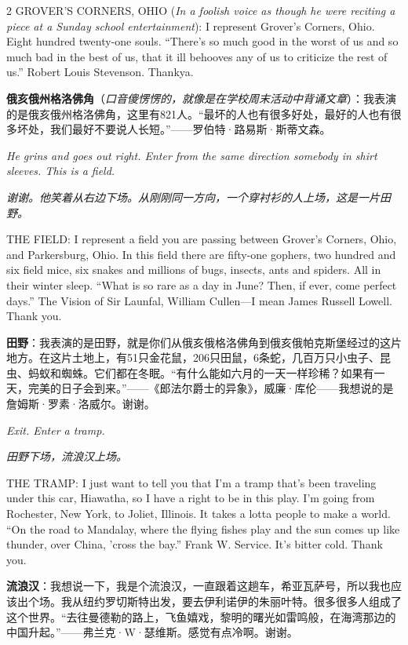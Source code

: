 \documentclass[lang=cn,newtx,10pt,scheme=chinese]{elegantbook}
\newcommand{\pair}[2]{%
\switchcolumn* #2\par
\switchcolumn  #1\par
}
\begin{document}
\begin{paracol}{2}
\pair{
    \textbf{俄亥俄州格洛佛角}（\textit{口音傻愣愣的，就像是在学校周末活动中背诵文章}）：我表演的是俄亥俄州格洛佛角，这里有821人。“最坏的人也有很多好处，最好的人也有很多坏处，我们最好不要说人长短。”——罗伯特·路易斯·斯蒂文森。
}{
    GROVER'S CORNERS, OHIO (\textit{In a foolish voice as though he were reciting a piece at a Sunday school entertainment}): I represent Grover's Corners, Ohio. Eight hundred twenty-one souls. “There's so much good in the worst of us and so much bad in the best of us, that it ill behooves any of us to criticize the rest of us.” Robert Louis Stevenson. Thankya.
    \newline
    \newline
}

\pair{
    \textit{谢谢。他笑着从右边下场。从刚刚同一方向，一个穿衬衫的人上场，这是一片田野。}
}{
    \textit{He grins and goes out right. Enter from the same direction somebody in shirt sleeves. This is a field.}
    \newline
    \newline
}

\pair{
    \textbf{田野}：我表演的是田野，就是你们从俄亥俄格洛佛角到俄亥俄帕克斯堡经过的这片地方。在这片土地上，有51只金花鼠，206只田鼠，6条蛇，几百万只小虫子、昆虫、蚂蚁和蜘蛛。它们都在冬眠。“有什么能如六月的一天一样珍稀？如果有一天，完美的日子会到来。”——《郎法尔爵士的异象》，威廉·库伦——我想说的是詹姆斯·罗素·洛威尔。谢谢。
}{
    THE FIELD: I represent a field you are passing between Grover's Corners, Ohio, and Parkersburg, Ohio. In this field there are fifty-one gophers, two hundred and six field mice, six snakes and millions of bugs, insects, ants and spiders. All in their winter sleep. “What is so rare as a day in June? Then, if ever, come perfect days.” The Vision of Sir Launfal, William Cullen—I mean James Russell Lowell. Thank you.
    \newline
    \newline
}

\pair{
    \textit{田野下场，流浪汉上场。}
}{
    \textit{Exit. Enter a tramp.}
    \newline
    \newline
}

\pair{
    \textbf{流浪汉}：我想说一下，我是个流浪汉，一直跟着这趟车，希亚瓦萨号，所以我也应该出个场。我从纽约罗切斯特出发，要去伊利诺伊的朱丽叶特。很多很多人组成了这个世界。“去往曼德勒的路上，飞鱼嬉戏，黎明的曙光如雷鸣般，在海湾那边的中国升起。”——弗兰克·W·瑟维斯。感觉有点冷啊。谢谢。
}{
    THE TRAMP: I just want to tell you that I'm a tramp that's been traveling under this car, Hiawatha, so I have a right to be in this play. I'm going from Rochester, New York, to Joliet, Illinois. It takes a lotta people to make a world. “On the road to Mandalay, where the flying fishes play and the sun comes up like thunder, over China, ’cross the bay.” Frank W. Service. It's bitter cold. Thank you.
    \newline
    \newline
}


\end{paracol}
\end{document}

